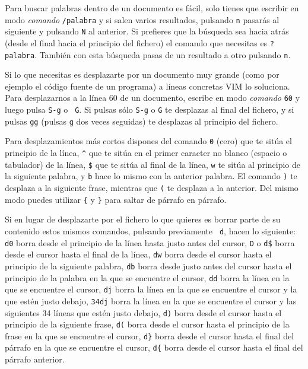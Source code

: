 Para buscar palabras dentro de un  documento es fácil, solo tienes que
 escribir  en modo {\em comando}  {\tt /palabra} y
si salen  varios resultados, pulsando  {\tt n} pasarás al  siguiente y
pulsando {\tt N}  al anterior. Si prefieres que la  búsqueda sea hacia
atrás (desde el  final hacia el principio del fichero)  el comando que
necesitas es  {\tt ?palabra}.  También con esta  búsqueda pasas  de un
resultado a otro pulsando {\tt n}.

Si lo que  necesitas es desplazarte por un documento  muy grande (como
por ejemplo el  código fuente de un programa) a  líneas concretas {\sf
VIM} lo  soluciona. Para desplazarnos a  la línea 60 de  un documento,
escribe en modo {\em comando} {\tt 60}  y luego pulsa {\tt S-g} o {\tt
G}. Si  pulsas sólo  {\tt S-g}  o {\tt  G} te  desplazas al  final del
fichero, y si  pulsas {\tt gg} (pulsas {\tt g}  dos veces seguidas) te
desplazas al principio del fichero.

Para desplazamientos  más cortos dispones  del comando {\tt  0} (cero)
que te  sitúa el principio  de la línea, \verb.^.  que te sitúa  en el
primer caracter no blanco (espacio  o tabulador) de la línea, \verb.$.
que te sitúa al final de la línea, {\tt w} te sitúa al principio de la
siguiente palabra, y {\tt b} hace lo mismo con la anterior palabra. El
comando  \verb.).  te desplaza  a  la  siguiente frase,  mientras  que
\verb.(. te  desplaza a  la anterior. Del  mismo modo  puedes utilizar
\verb.{. y \verb.}. para saltar de párrafo en párrafo.

Si en  lugar de desplazarte  por el fichero  lo que quieres  es borrar
parte de su contenido estos mismos comandos, pulsando previamente {\tt
d}, hacen lo siguiente: {\tt d0}  borra desde el principio de la línea
hasta  justo antes  del cursor,  {\tt D}  o \verb.d$.  borra desde  el
cursor hasta  el final  de la  línea, {\tt dw}  borra desde  el cursor
hasta el principio de la siguiente palabra, {\tt db} borra desde justo
antes  del cursor  hasta  el principio  de  la palabra  en  la que  se
encuentre el cursor, {\tt dd} borra la línea en la que se encuentre el
cursor, {\tt dj} borra la línea en  la que se encuentre el cursor y la
que  estén justo  debajo,  {\tt 34dj}  borra  la línea  en  la que  se
encuentre el cursor y las siguientes 34 líneas que estén justo debajo,
\verb.d). borra  desde el  cursor hasta el  principio de  la siguiente
frase, \verb.d(. borra desde el cursor  hasta el principio de la frase
en la  que se  encuentre el  cursor, \verb.d}.  borra desde  el cursor
hasta el final del párrafo en la que se encuentre el cursor, \verb.d{.
borra desde el cursor hasta el final del párrafo anterior.

